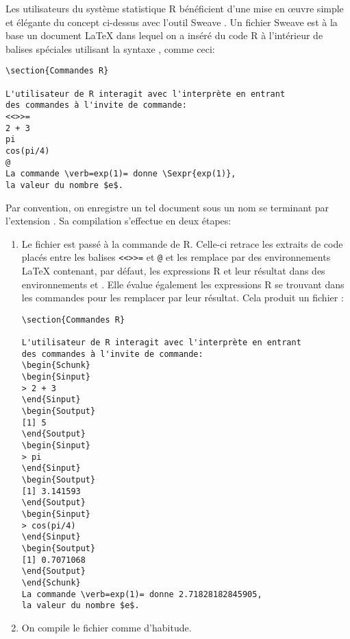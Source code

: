 Les utilisateurs du système statistique R bénéficient d'une mise
en œuvre simple et élégante du concept ci-dessus avec l'outil Sweave
\citep{Sweave}. Un fichier Sweave est à la base un document {\LaTeX}
dans lequel on a inséré du code R à l'intérieur de balises spéciales
utilisant la syntaxe  \citep{noweb}, comme ceci:
\begin{lstlisting}
\section{Commandes R}

L'utilisateur de R interagit avec l'interprète en entrant
des commandes à l'invite de commande:
<<>>=
2 + 3
pi
cos(pi/4)
@
La commande \verb=exp(1)= donne \Sexpr{exp(1)},
la valeur du nombre $e$.
\end{lstlisting}

Par convention, on enregistre un tel document sous un nom se terminant
par l'extension . Sa compilation s'effectue
en deux étapes:
\begin{enumerate}
\item Le fichier  est passé à la commande 
  de R. Celle-ci retrace les extraits de code placés entre les balises
  \verb|<<>>=| et \verb|@| et les remplace par des environnements
  {\LaTeX} contenant, par défaut, les expressions R et leur résultat
  dans des environnements  et . Elle évalue
  également les expressions R se trouvant dans les commandes
  \cmd{\Sexpr} pour les remplacer par leur résultat. Cela produit un
  fichier :
\begin{lstlisting}
\section{Commandes R}

L'utilisateur de R interagit avec l'interprète en entrant
des commandes à l'invite de commande:
\begin{Schunk}
\begin{Sinput}
> 2 + 3
\end{Sinput}
\begin{Soutput}
[1] 5
\end{Soutput}
\begin{Sinput}
> pi
\end{Sinput}
\begin{Soutput}
[1] 3.141593
\end{Soutput}
\begin{Sinput}
> cos(pi/4)
\end{Sinput}
\begin{Soutput}
[1] 0.7071068
\end{Soutput}
\end{Schunk}
La commande \verb=exp(1)= donne 2.71828182845905,
la valeur du nombre $e$.
\end{lstlisting}
\item On compile le fichier  comme d'habitude.
\end{enumerate}

